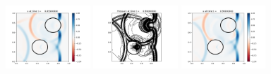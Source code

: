 \documentclass[11pt]{article}
\begin{document}
\includegraphics[width=0.2375\textwidth]{frame0019fig1.png}
\vskip 10pt 
\includegraphics[width=0.2375\textwidth]{frame0020fig0.png}
\includegraphics[width=0.2375\textwidth]{frame0020fig1.png}
\end{document}
